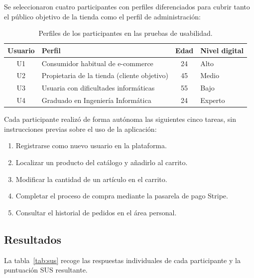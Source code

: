 Se seleccionaron cuatro participantes con perfiles diferenciados para cubrir tanto el público objetivo de la tienda como el perfil de administración:

\begin{table}[H]
\centering
\small
\begin{tabular}{|c|l|c|l|}
\hline
\textbf{Usuario} & \textbf{Perfil} & \textbf{Edad} & \textbf{Nivel digital} \\
\hline
U1 & Consumidor habitual de e-commerce         & 24 & Alto   \\
\hline
U2 & Propietaria de la tienda (cliente objetivo) & 45 & Medio  \\
\hline
U3 & Usuaria con dificultades informáticas      & 55 & Bajo   \\
\hline
U4 & Graduado en Ingeniería Informática         & 24 & Experto \\
\hline
\end{tabular}
\caption{Perfiles de los participantes en las pruebas de usabilidad.}
\end{table}

Cada participante realizó de forma autónoma las siguientes cinco tareas, sin instrucciones previas sobre el uso de la aplicación:

\begin{enumerate}
    \item Registrarse como nuevo usuario en la plataforma.
    \item Localizar un producto del catálogo y añadirlo al carrito.
    \item Modificar la cantidad de un artículo en el carrito.
    \item Completar el proceso de compra mediante la pasarela de pago Stripe.
    \item Consultar el historial de pedidos en el área personal.
\end{enumerate}

\subsection{Resultados}

La tabla~\ref{tab:sus} recoge las respuestas individuales de cada participante y la puntuación SUS resultante.

